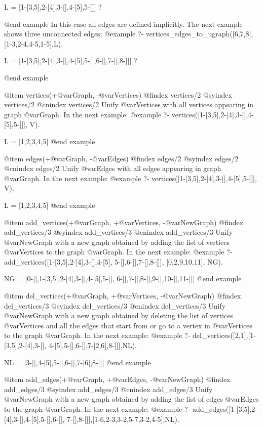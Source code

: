{{{{{{{{L = [1-[3,5],2-[4],3-[],4-[5],5-[]] ? 

@end example
In this case all edges are defined implicitly. The next example shows
three unconnected edges:
@example 
?- vertices_edges_to_ugraph([6,7,8],[1-3,2-4,4-5,1-5],L).

L = [1-[3,5],2-[4],3-[],4-[5],5-[],6-[],7-[],8-[]] ? 

@end example

@item vertices(+@var{Graph}, -@var{Vertices})
@findex  vertices/2
@syindex vertices/2
@cnindex vertices/2
Unify @var{Vertices} with all vertices appearing in graph
@var{Graph}. In the next example:
@example
?- vertices([1-[3,5],2-[4],3-[],4-[5],5-[]], V).

L = [1,2,3,4,5]
@end example

@item edges(+@var{Graph}, -@var{Edges})
@findex  edges/2
@syindex edges/2
@cnindex edges/2
Unify @var{Edges} with all edges appearing in graph
@var{Graph}. In the next example:
@example
?- vertices([1-[3,5],2-[4],3-[],4-[5],5-[]], V).

L = [1,2,3,4,5]
@end example

@item add_vertices(+@var{Graph}, +@var{Vertices}, -@var{NewGraph})
@findex  add_vertices/3
@syindex add_vertices/3
@cnindex add_vertices/3
Unify @var{NewGraph} with a new graph obtained by adding the list of
vertices @var{Vertices} to the graph @var{Graph}. In the next example:
@example
?- add_vertices([1-[3,5],2-[4],3-[],4-[5],
                 5-[],6-[],7-[],8-[]],
                [0,2,9,10,11],
                   NG).

NG = [0-[],1-[3,5],2-[4],3-[],4-[5],5-[],
      6-[],7-[],8-[],9-[],10-[],11-[]]
@end example

@item del_vertices(+@var{Graph}, +@var{Vertices}, -@var{NewGraph})
@findex  del_vertices/3
@syindex del_vertices/3
@cnindex del_vertices/3
Unify @var{NewGraph} with a new graph obtained by deleting the list of
vertices @var{Vertices} and all the edges that start from or go to a
vertex in @var{Vertices} to the graph @var{Graph}. In the next example:
@example
?- del_vertices([2,1],[1-[3,5],2-[4],3-[],
                 4-[5],5-[],6-[],7-[2,6],8-[]],NL).

NL = [3-[],4-[5],5-[],6-[],7-[6],8-[]]
@end example

@item add_edges(+@var{Graph}, +@var{Edges}, -@var{NewGraph})
@findex  add_edges/3
@syindex add_edges/3
@cnindex add_edges/3
Unify @var{NewGraph} with a new graph obtained by adding the list of
edges @var{Edges} to the graph @var{Graph}. In the next example:
@example
?- add_edges([1-[3,5],2-[4],3-[],4-[5],5-[],6-[],
              7-[],8-[]],[1-6,2-3,3-2,5-7,3-2,4-5],NL).

}}}}}}}}
